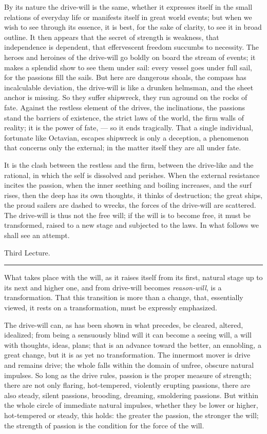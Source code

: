 \documentclass[12pt,a4paper,openany]{book}
\newcommand{\opage}[1]{\marginnote{\footnotesize\textit{[#1]}}}
\newcommand{\lecture}[1]{\clearpage\begin{center}{\large #1}\\[0.4em]\rule{3em}{0.4pt}\end{center}\medskip\noindent}
\begin{document}
By its nature the drive-will is the same, whether it
expresses itself in the small relations of everyday life or manifests itself in
great world events; but when we wish to
see through its essence, it is best, for the sake of clarity,
to see it in broad outline. It then appears that
the secret of strength is weakness, that independence is
dependent, that effervescent freedom succumbs to
necessity. The heroes and heroines of the drive-will go
\setcounter{footnote}{0}%
\opage{22}boldly on board the stream of events; it makes a
splendid show to see them under sail: every vessel goes under
full sail, for the passions fill the sails. But here are
dangerous shoals, the compass has incalculable deviation, the drive-will
is like a drunken helmsman, and the sheet anchor is missing.
So they suffer shipwreck, they run aground on the rocks of fate.
Against the restless element of the drives, the inclinations, the passions
stand the barriers of existence, the strict laws of the world,
the firm walls of reality; it is the power of fate, ---
so it ends tragically. That a single individual, fortunate like Octavian,
escapes shipwreck is only a deception, a phenomenon
that concerns only the external; in the matter itself they are
all under fate.

It is the clash between the restless and the firm,
between the drive-like and the rational, in which the self is dissolved
and perishes. When the external resistance incites
the passion, when the inner seething and boiling increases, and
the surf rises, then the deep has its own thoughts, it
thinks of destruction; the great ships, the proud sailers
are dashed to wrecks, the forces of the drive-will are scattered. The drive-will is
thus not the free will; if the will is to become free, it must be
transformed, raised to a new stage and subjected to the laws.
In what follows we shall see an attempt.

\setcounter{footnote}{0}%
\lecture{Third Lecture.}\opage{23}

What takes place with the will, as it raises itself from its first, natural stage up to its next and higher one, and from
drive-will becomes \emph{reason-will}, is a transformation. That this transition is more than a change, that, essentially
viewed, it rests on a transformation, must be expressly emphasized.

The drive-will can, as has been shown in what precedes, be cleared, altered, idealized; from being a sensuously blind will
it can become a seeing will, a will with thoughts, ideas, plans; that is an advance toward the better, an ennobling, a great
change, but it is as yet no transformation. The innermost mover is drive and remains drive; the whole falls within the
domain of unfree, obscure natural impulses. So long as the drive rules, passion is the proper measure of strength; there are
not only flaring, hot-tempered, violently erupting passions, there are also steady, silent passions, brooding, dreaming,
smoldering passions. But within the whole circle of immediate natural impulses, whether they be lower or higher, hot-tempered
or steady, this holds: the greater the passion, the stronger the will; the strength of passion is the condition for the force
of the will.
\end{document}
